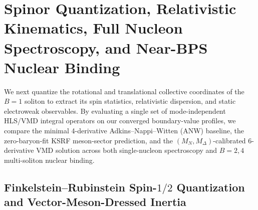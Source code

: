 \documentclass[10pt,aps,prd,twocolumn,superscriptaddress,nofootinbib,floatfix,longbibliography,showkeys]{revtex4-2}
\begin{document}
\section{Spinor Quantization, Relativistic Kinematics, Full Nucleon Spectroscopy, and Near-BPS Nuclear Binding}\label{sec:4}

We next quantize the rotational and translational collective coordinates of the $B=1$ soliton to extract its spin statistics, relativistic dispersion, and static electroweak observables. By evaluating a single set of mode-independent HLS/VMD integral operators on our converged boundary-value profiles, we compare the minimal 4-derivative Adkins--Nappi--Witten (ANW) baseline, the zero-baryon-fit KSRF meson-sector prediction, and the $(M_N, M_\Delta)$-calibrated 6-derivative VMD solution across both single-nucleon spectroscopy and $B=2,4$ multi-soliton nuclear binding.


\subsection{Finkelstein--Rubinstein Spin-$1/2$ Quantization and Vector-Meson-Dressed Inertia}\label{sec:4.1}
\end{document}
